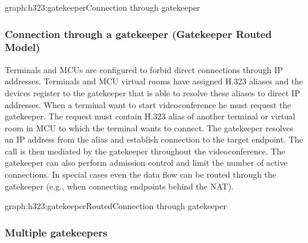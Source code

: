 \begin{Graph}{graph:h323:gatekeeper}{Connection through gatekeeper}
  
  
\end{Graph}

\subsubsection{Connection through a gatekeeper (Gatekeeper Routed Model)}

Terminals and MCUs are configured to forbid direct connections through IP 
addresses. Terminals and MCU virtual rooms have assigned H.323 aliases and the 
devices register to the gatekeeper that is able to resolve these aliases to 
direct IP addresses. When a terminal want to start videoconference he must 
request the gatekeeper. The request must contain H.323 alias of another 
terminal or virtual room in MCU to which the terminal wants to connect. The 
gatekeeper resolves an IP address from the alias and establish connection to 
the target endpoint. The call is then mediated by the gatekeeper throughout 
the videoconference. The gatekeeper can also perform admission control and 
limit the number of active connections. In special cases even the data flow 
can be routed through the gatekeeper (e.g., when connecting endpoints behind 
the NAT).

\begin{Graph}{graph:h323:gatekeeperRouted}{Connection through gatekeeper}
  
  
\end{Graph}

\subsubsection{Multiple gatekeepers}


